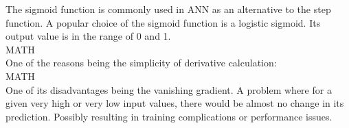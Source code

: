 The sigmoid function is commonly used in ANN as an alternative to the step function. A popular choice of the sigmoid function is a logistic sigmoid. Its output value is in the range of 0 and 1.\\

MATH\\

One of the reasons being the simplicity of derivative calculation:\\

MATH\\

One of its disadvantages being the vanishing gradient. A problem where for a given very high or very low input values, there would be almost no change in its prediction. Possibly resulting in training complications or performance issues.\cite{7typesActivationFunction}